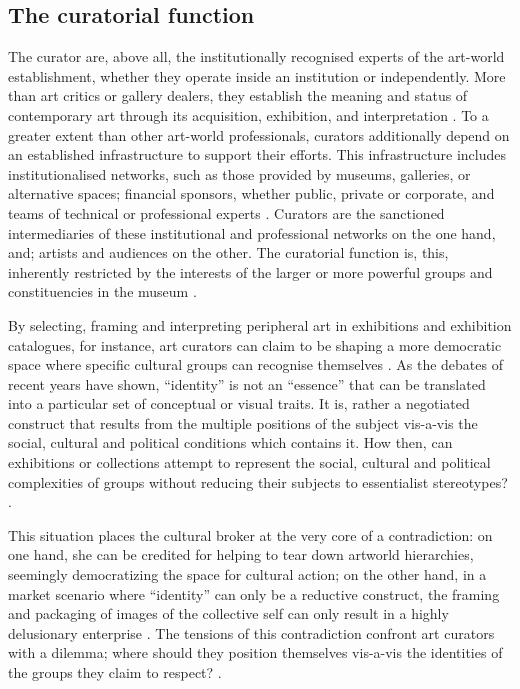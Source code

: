 

\subsection{The curatorial function}
The curator are, above all, the institutionally recognised experts of the art-world establishment, whether they operate inside an institution or independently. More than art critics or gallery dealers, they establish the meaning and status of contemporary art through its acquisition, exhibition, and interpretation \autocite[p. 22]{Thi_book}. To a greater extent than other art-world professionals, curators additionally depend on an established infrastructure to support their efforts. This infrastructure includes institutionalised networks, such as those provided by museums, galleries, or alternative spaces; financial sponsors, whether public, private or corporate, and teams of technical or professional experts \autocite[p. 22]{Thi_book}. Curators are the sanctioned intermediaries of these institutional and professional networks on the one hand, and; artists and audiences on the other. The curatorial function is, this, inherently restricted by the interests of the larger or more powerful groups and constituencies in the museum \autocite[p. 22]{Thi_book}.

By selecting, framing and interpreting peripheral art in exhibitions and exhibition catalogues, for instance, art curators can claim to be shaping a more democratic space where specific cultural groups can recognise themselves \autocite[p. 23]{Thi_book}. As the debates of recent years have shown, “identity” is not an “essence” that can be translated into a particular set of conceptual or visual traits. It is, rather a negotiated construct that results from the multiple positions of the subject vis-a-vis the social, cultural and political conditions which contains it. How then, can exhibitions or collections attempt to represent the social, cultural and political complexities of groups without reducing their subjects to essentialist stereotypes? \autocite[p. 23]{Thi_book}.

This situation places the cultural broker at the very core of a contradiction: on one hand, she can be credited for helping to tear down artworld hierarchies, seemingly democratizing the space for cultural action; on the other hand, in a market scenario where “identity” can only be a reductive construct, the framing and packaging of images of the collective self can only result in a highly delusionary enterprise \autocite[p. 23-24]{Thi_book}. The tensions of this contradiction confront art curators with a dilemma; where should they position themselves vis-a-vis the identities of the groups they claim to respect? \autocite[p. 24]{Thi_book}.

